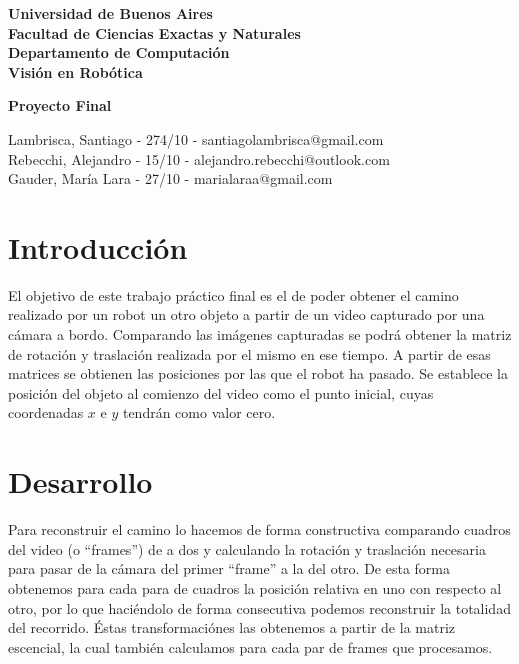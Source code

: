 \documentclass[10pt, a4paper,english,spanish,hidelinks]{article}
\begin{document}
\begin{titlepage}
\begin{flushright}
\textbf{\huge{Universidad de Buenos Aires}}\\
\vspace*{10pt}
\textbf{\LARGE{Facultad de Ciencias Exactas y Naturales}}\\
\vspace*{10pt}
\textbf{\Large{Departamento de Computación}}\\
\vspace*{10pt}
\textbf{\Large{Visión en Robótica}}\\
\end{flushright}

\vspace*{5cm}

\begin{center}
 \Huge{\textbf{Proyecto Final \\ \textit{}}}
\end{center}
\vspace*{7cm}
\Large{
\begin{flushright}
Lambrisca, Santiago - 274/10 - santiagolambrisca@gmail.com\\
Rebecchi, Alejandro - 15/10 - alejandro.rebecchi@outlook.com\\
Gauder, María Lara - 27/10 - marialaraa@gmail.com\\
\end{flushright}
}
\end{titlepage}


\lstset{language=c, breaklines=true, basicstyle=\footnotesize}
\lstset{numbers=left, numberstyle=\tiny, stepnumber=1, numbersep=-2pt}


\newpage
\section{Introducción}
El objetivo de este trabajo práctico final es el de poder obtener el camino
realizado por un robot un otro objeto a partir de un video capturado por una cámara a bordo.
Comparando las imágenes capturadas se podrá obtener la matriz de rotación y traslación realizada 
por el mismo en ese tiempo. A partir de esas matrices se obtienen las posiciones por las que
el robot ha pasado. Se establece la posición del objeto al comienzo del video como el punto inicial,
cuyas coordenadas $x$ e $y$ tendrán como valor cero. 

\section{Desarrollo}
Para reconstruir el camino lo hacemos de forma constructiva comparando cuadros del video (o ``frames'') de a dos y calculando la 
rotación y traslación necesaria para pasar de la cámara del primer ``frame'' a la del otro. De esta forma obtenemos para cada para de
cuadros la posición relativa en uno con respecto al otro, por lo que haciéndolo de forma consecutiva podemos reconstruir la
totalidad del recorrido. Éstas transformaciónes las obtenemos a partir de la matriz escencial, la cual también calculamos para
cada par de frames que procesamos.
\end{document}
